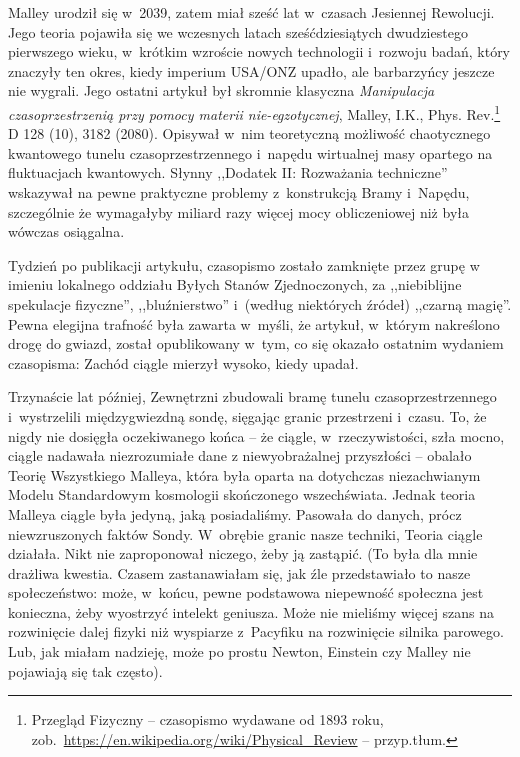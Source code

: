 \documentclass[oneside,polish,11pt,sfheadings]{mwbk}
\begin{document}
Malley urodził się w~2039, zatem miał sześć lat w~czasach Jesiennej
Rewolucji. Jego teoria pojawiła się we wczesnych latach sześćdziesiątych
dwudziestego pierwszego wieku, w~krótkim wzroście nowych technologii i~rozwoju badań, który znaczyły ten okres, kiedy imperium USA/ONZ upadło,
ale barbarzyńcy jeszcze nie wygrali. Jego ostatni artykuł był skromnie
klasyczna \textit{Manipulacja czasoprzestrzenią przy pomocy materii
nie-egzotycznej}, Malley, I.K., Phys. Rev.\footnote{Przegląd Fizyczny -- czasopismo wydawane od 1893 roku, zob.~\url{https://en.wikipedia.org/wiki/Physical\_Review}
-- przyp.tłum.} D 128 (10), 3182 (2080). Opisywał w~nim teoretyczną
możliwość chaotycznego kwantowego tunelu czasoprzestrzennego i~napędu
wirtualnej masy opartego na fluktuacjach kwantowych. Słynny ,,Dodatek
II: Rozważania techniczne'' wskazywał na pewne praktyczne problemy z~konstrukcją Bramy i~Napędu, szczególnie że wymagałyby miliard razy
więcej mocy obliczeniowej niż była wówczas osiągalna.

Tydzień po publikacji artykułu, czasopismo zostało zamknięte przez grupę
w imieniu lokalnego oddziału Byłych Stanów Zjednoczonych, za
,,niebiblijne spekulacje fizyczne'', ,,bluźnierstwo'' i~(według
niektórych źródeł) ,,czarną magię''. Pewna elegijna trafność była
zawarta w~myśli, że artykuł, w~którym nakreślono drogę do gwiazd, został
opublikowany w~tym, co się okazało ostatnim wydaniem czasopisma: Zachód
ciągle mierzył wysoko, kiedy upadał.

Trzynaście lat później, Zewnętrzni zbudowali bramę tunelu
czasoprzestrzennego i~wystrzelili międzygwiezdną sondę, sięgając granic
przestrzeni i~czasu. To, że nigdy nie dosięgła oczekiwanego końca -- że
ciągle, w~rzeczywistości, szła mocno, ciągle nadawała niezrozumiałe dane
z niewyobrażalnej przyszłości -- obalało Teorię Wszystkiego Malleya,
która była oparta na dotychczas niezachwianym Modelu Standardowym
kosmologii skończonego wszechświata. Jednak teoria Malleya ciągle była
jedyną, jaką posiadaliśmy. Pasowała do danych, prócz niewzruszonych
faktów Sondy. W~obrębie granic nasze techniki, Teoria ciągle działała.
Nikt nie zaproponował niczego, żeby ją zastąpić. (To była dla mnie
drażliwa kwestia. Czasem zastanawiałam się, jak źle przedstawiało to
nasze społeczeństwo: może, w~końcu, pewne podstawowa niepewność
społeczna jest konieczna, żeby wyostrzyć intelekt geniusza. Może nie
mieliśmy więcej szans na rozwinięcie dalej fizyki niż wyspiarze z~Pacyfiku na rozwinięcie silnika parowego. Lub, jak miałam nadzieję, może
po prostu Newton, Einstein czy Malley nie pojawiają się tak często).
\end{document}
